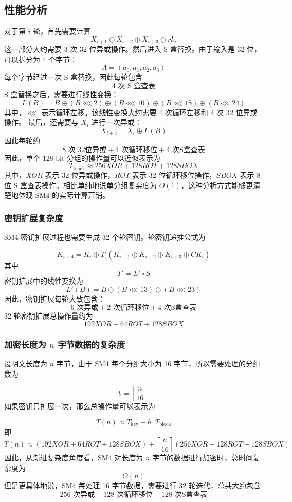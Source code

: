 \subsection{性能分析}
对于第 \(i\) 轮，首先需要计算
\[
X_{i+1}\oplus X_{i+2}\oplus X_{i+3}\oplus rk_i
\]
这一部分大约需要 3 次 32 位异或操作。然后进入 S 盒替换。由于输入是 32 位，可以拆分为 4 个字节：
\[
A=(a_0,a_1,a_2,a_3)
\]
每个字节经过一次 S 盒替换，因此每轮包含
\[
4 \text{ 次 S 盒查表}
\]
S 盒替换之后，需要进行线性变换：
\[
L(B)
=
B\oplus (B\lll 2)\oplus (B\lll 10)
\oplus (B\lll 18)\oplus (B\lll 24)
\]
其中，\(\lll\) 表示循环左移。该线性变换大约需要 4 次循环左移和 4 次 32 位异或操作。
最后，还需要与 \(X_i\) 进行一次异或：
\[
X_{i+4}=X_i\oplus L(B)
\]
因此每轮约
\[
8\text{ 次 32位异或}
+
4\text{ 次循环移位}
+
4\text{ 次S盒查表}
\]
因此，单个 128 bit 分组的操作量可以近似表示为
\[
\boxed{
T_{\text{block}}
\approx
256XOR + 128ROT + 128SBOX
}
\]
其中，\(XOR\) 表示 32 位异或操作，\(ROT\) 表示 32 位循环移位操作，\(SBOX\) 表示 8 位 S 盒查表操作。相比单纯地说单分组复杂度为 \(O(1)\)，这种分析方式能够更清楚地体现 SM4 的实际计算开销。

\subsubsection{密钥扩展复杂度}

SM4 密钥扩展过程也需要生成 32 个轮密钥。轮密钥递推公式为

\[
K_{i+4}
=
K_i \oplus T'(K_{i+1}\oplus K_{i+2}\oplus K_{i+3}\oplus CK_i)
\]
其中
\[
T'=L'\circ S
\]
密钥扩展中的线性变换为
\[
L'(B)=B\oplus (B\lll 13)\oplus (B\lll 23)
\]
因此，密钥扩展每轮大致包含：
\[
6 \text{ 次异或}
+
2\text{ 次循环移位}
+
4\text{ 次S盒查表}
\]
32 轮密钥扩展总操作量约为
\[
\boxed{
192XOR + 64ROT + 128SBOX
}
\]

\subsubsection{加密长度为 \(n\) 字节数据的复杂度}

设明文长度为 \(n\) 字节，由于 SM4 每个分组大小为 16 字节，所以需要处理的分组数为

\[
b=\left\lceil \frac{n}{16} \right\rceil
\]
如果密钥只扩展一次，那么总操作量可以表示为

\[
T(n)
\approx
T_{\text{key}} + b \cdot T_{\text{block}}
\]
即
\[
T(n)
\approx
(192XOR + 64ROT + 128SBOX)
+
\left\lceil \frac{n}{16} \right\rceil
(256XOR + 128ROT + 128SBOX)
\]
因此，从渐进复杂度角度看，SM4 对长度为 \(n\) 字节的数据进行加密时，总时间复杂度为
\[
\boxed{O(n)}
\]
但是更具体地说，SM4 每处理 16 字节数据，需要进行 32 轮迭代，总共大约包含
\[
\boxed{
256\text{ 次异或}
+
128\text{ 次循环移位}
+
128\text{ 次S盒查表}
}
\]
